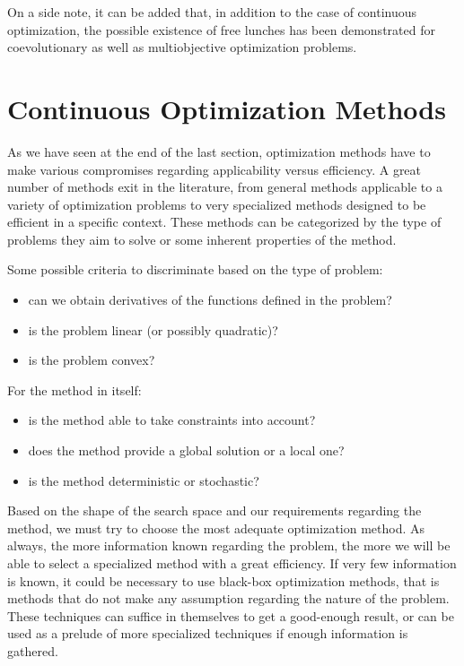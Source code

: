 On a side note, it can be added that, in addition to the case of continuous optimization, the possible existence of free lunches has been demonstrated for coevolutionary \cite{1545946} as well as multiobjective \cite{1299403} optimization problems.

\section{Continuous Optimization Methods}

As we have seen at the end of the last section, optimization methods have to make various compromises regarding applicability versus efficiency. A great number of methods exit in the literature, from general methods applicable to a variety of optimization problems to very specialized methods designed to be efficient in a specific context. These methods can be categorized by the type of problems they aim to solve or some inherent properties of the method.

Some possible criteria to discriminate based on the type of problem:
\begin{itemize}
\item can we obtain derivatives of the functions defined in the problem?
\item is the problem linear (or possibly quadratic)?
\item is the problem convex?
\end{itemize}

For the method in itself:
\begin{itemize}
\item is the method able to take constraints into account?
\item does the method provide a global solution or a local one?
\item is the method deterministic or stochastic?
\end{itemize}

Based on the shape of the search space and our requirements regarding the method, we must try to choose the most adequate optimization method. As always, the more information known regarding the problem, the more we will be able to select a specialized method with a great efficiency. If very few information is known, it could be necessary to use black-box optimization methods, that is methods that do not make any assumption regarding the nature of the problem. These techniques can suffice in themselves to get a good-enough result, or can be used as a prelude of more specialized techniques if enough information is gathered.

